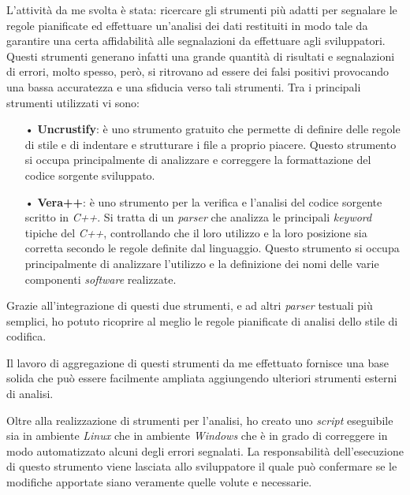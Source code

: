L'attività da me svolta è stata: ricercare gli strumenti più adatti per segnalare le regole pianificate ed effettuare un'analisi dei dati restituiti in modo tale da garantire una certa affidabilità alle segnalazioni da effettuare agli sviluppatori. Questi strumenti generano infatti una grande quantità di risultati e segnalazioni di errori, molto spesso, però, si ritrovano ad essere dei falsi positivi provocando una bassa accuratezza e una sfiducia verso tali strumenti. Tra i principali strumenti utilizzati vi sono:
\begin{itemize}
\item[•] \textbf{Uncrustify}: è uno strumento gratuito che permette di definire delle regole di stile e di indentare e strutturare i file a proprio piacere. Questo strumento si occupa principalmente di analizzare e correggere la formattazione del codice sorgente sviluppato.

\item[•] \textbf{Vera++}: è uno strumento per la verifica e l'analisi del codice sorgente scritto in \textit{C++}. Si tratta di un \textit{parser} che analizza le principali \textit{keyword} tipiche del \textit{C++}, controllando che il loro utilizzo e la loro posizione sia corretta secondo le regole definite dal linguaggio. Questo strumento si occupa principalmente di analizzare l'utilizzo e la definizione dei nomi delle varie componenti \textit{software} realizzate.
\end{itemize}

Grazie all'integrazione di questi due strumenti, e ad altri \textit{parser} testuali più semplici, ho potuto ricoprire al meglio le regole pianificate di analisi dello stile di codifica.

Il lavoro di aggregazione di questi strumenti da me effettuato fornisce una base solida che può essere facilmente ampliata aggiungendo ulteriori strumenti esterni di analisi.

Oltre alla realizzazione di strumenti per l'analisi, ho creato uno \textit{script} eseguibile sia in ambiente \textit{Linux} che in ambiente \textit{Windows} che è in grado di correggere in modo automatizzato alcuni degli errori segnalati. La responsabilità dell'esecuzione di questo strumento viene lasciata allo sviluppatore il quale può confermare se le modifiche apportate siano veramente quelle volute e necessarie.


